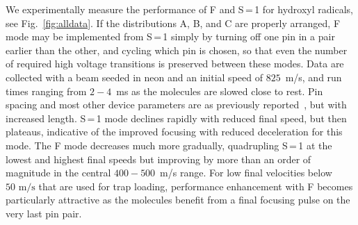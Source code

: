 \documentclass[%
 reprint,
 amsmath,amssymb,
 aps,
prl,
]{revtex4-1}
\begin{document}
We experimentally measure the performance of F and S\,=\,1 for hydroxyl radicals, see Fig.~\ref{fig:alldata}.
If the distributions A, B, and C are properly arranged, F mode may be implemented from S\,=\,1 simply by turning off one pin in a pair earlier than the other, and cycling which pin is chosen, so that even the number of required high voltage transitions is preserved between these modes.
Data are collected with a beam seeded in neon and an initial speed of $825$~m/s, and run times ranging from $2-4$~ms as the molecules are slowed close to rest.
Pin spacing and most other device parameters are as previously reported~\cite{Bochinski2004,Sawyer2007}, but with increased length.
S\,=\,1 mode declines rapidly with reduced final speed, but then plateaus, indicative of the improved focusing with reduced deceleration for this mode.
The F mode decreases much more gradually, quadrupling S\,=\,1 at the lowest and highest final speeds but improving by more than an order of magnitude in the central $400-500$~m/s range.
For low final velocities below $50\text{ m/s}$ that are used for trap loading, performance enhancement with F becomes particularly attractive as the molecules benefit from a final focusing pulse on the very last pin pair.
\end{document}
